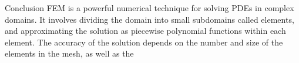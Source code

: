 \documentclass{beamer}
\begin{document}
\begin{frame}{Conclusion}
      FEM is a powerful numerical technique for solving PDEs in complex domains. It involves dividing the domain into small subdomains called elements, and approximating the solution as piecewise polynomial functions within each element. The accuracy of the solution depends on the number and size of the elements in the mesh, as well as the
\end{frame}
  
\end{document}
